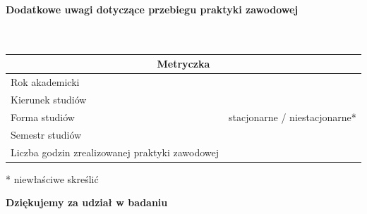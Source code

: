 \documentclass[11pt,a4paper]{article}
\begin{document}
\vspace{1em}
\noindent \textbf{Dodatkowe uwagi dotyczące przebiegu praktyki zawodowej} \\
\dotfill \\
\dotfill \\
\dotfill

\vspace{2em}
\begin{center}
\renewcommand{\arraystretch}{1.5}
\begin{tabular}{|p{7cm}|p{7cm}|}
\hline
\multicolumn{2}{|c|}{\textbf{Metryczka}} \\ \hline
Rok akademicki & \\ \hline
Kierunek studiów & \\ \hline
Forma studiów & stacjonarne / niestacjonarne* \\ \hline
Semestr studiów & \\ \hline
Liczba godzin zrealizowanej praktyki zawodowej & \\ \hline
\end{tabular}
\end{center}

\vspace{0.5em}
\noindent \footnotesize{* niewłaściwe skreślić} \normalsize

\vspace{2em}
\begin{center}
\textbf{Dziękujemy za udział w badaniu}
\end{center}
\end{document}

